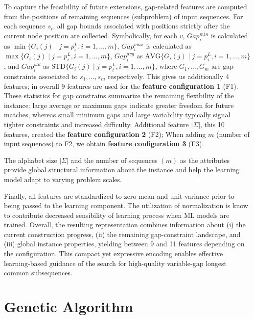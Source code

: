 \documentclass[11pt,a4paper]{article}
\begin{document}
To capture the feasibility of future extensions, gap-related features are computed from the positions of remaining sequences (subproblem) of input sequences. For each sequence $s_i$, all gap bounds associated with positions strictly after the current node position are collected. Symbolically, for each $v$,  $Gap^{min}_i$ is calculated as $\min\{ G_i(j) \mid j=p_i^L, i=1, \ldots, m \}$,  $Gap^{max}_i$ is calculated as $\max\{ G_i(j) \mid j=p_i^L, i=1, \ldots, m \}$,  $Gap^{avg}_i$  as $\text{AVG}\{ G_i(j) \mid j=p_i^L, i=1, \ldots, m \}$, and  
 $Gap^{std}_i$  as $\text{STD}\{ G_i(j) \mid j=p_i^L, i=1, \ldots, m \}$, where $G_1, \ldots, G_m$ are gap constraints associated to $s_1, \ldots, s_m$ respectively. This gives us additionally 4 features; in overall 9 features are used for the \textbf{feature configuration 1} (F1).  These statistics for gap constrains summarize the remaining flexibility of the instance: large average or maximum gaps indicate greater freedom for future matches, whereas small minimum gaps and large variability typically signal tighter constraints and increased difficulty.
  Additional feature $|\Sigma|$, this 10 features, created the \textbf{feature configuration 2} (F2); When adding $m$ (number of input sequences) to F2, we obtain \textbf{feature configuration 3} (F3). 
 

The alphabet size $|\Sigma|$ and the number of sequences $(m)$ as the attributes provide global structural information about the instance and help the learning model adapt to varying problem scales.

Finally, all features are standardized to zero mean and unit variance prior to being passed to the learning component. The utilization of normalization is know to contribute decreased sensibility of learning process when ML models are trained.  
Overall, the resulting representation combines information about (i) the current construction progress, (ii) the remaining gap-constraint landscape, and (iii) global instance properties, yielding between 9 and 11 features depending on the configuration. This compact yet expressive encoding enables effective learning-based guidance of the search for high-quality variable-gap longest common subsequences.
 
\section{Genetic Algorithm}
\end{document}
